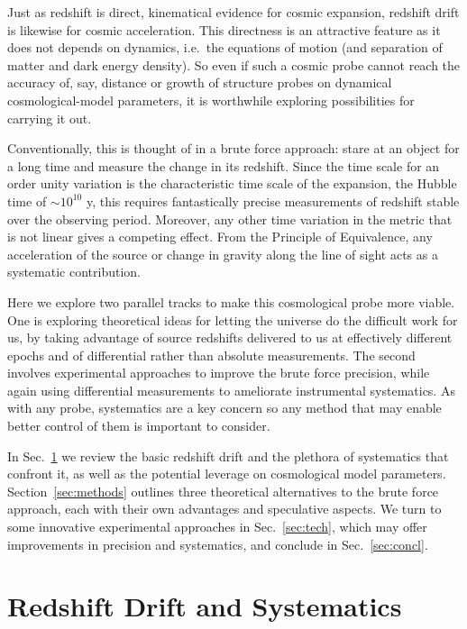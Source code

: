 \documentclass[preprint2, 10pt]{aastex}
\begin{document}
Just as redshift is direct, kinematical evidence for cosmic expansion, 
redshift drift is likewise for cosmic acceleration.  This directness is 
an attractive feature as it does not depends on dynamics, i.e.\ the equations 
of motion (and separation of matter and dark energy density). 
So even if such a cosmic probe cannot reach the 
accuracy of, say, distance or growth of structure probes on dynamical 
cosmological-model parameters, it is worthwhile exploring possibilities 
for carrying it out. 

Conventionally, this is thought of in a brute force approach: stare at an 
object for a long time and measure the change in its redshift.  
Since the time scale for an order unity variation is the characteristic 
time scale of the expansion, the Hubble time of $\sim10^{10}$ y, this 
requires fantastically precise measurements of redshift stable over the 
observing period.  Moreover, any other time variation in the metric that 
is not linear gives a competing effect.  From the Principle of Equivalence, 
any acceleration of the source or change in gravity along the line of sight 
acts as a systematic contribution. 

Here we explore two parallel tracks to make this cosmological probe more 
viable. One is exploring theoretical ideas for letting the universe do the 
difficult work for us, by taking advantage of source redshifts delivered 
to us at effectively different epochs and of differential rather than absolute 
measurements.  The second involves experimental approaches to improve the 
brute force precision, while again using differential measurements to 
ameliorate instrumental systematics. As with any probe, systematics are a 
key concern so any method that may enable better control of them is 
important to consider. 

In Sec.~\ref{sec:basic} we review the basic redshift drift and the plethora 
of systematics that confront it, as well as the potential leverage on 
cosmological model parameters.  Section~\ref{sec:methods} outlines three 
theoretical alternatives to the brute force approach, each with their own 
advantages and speculative aspects. 
We turn to some innovative experimental approaches in Sec.~\ref{sec:tech}, 
which may offer improvements in precision and systematics, and conclude in 
Sec.~\ref{sec:concl}. 


\section{Redshift Drift and Systematics} \label{sec:basic} 
\end{document}
